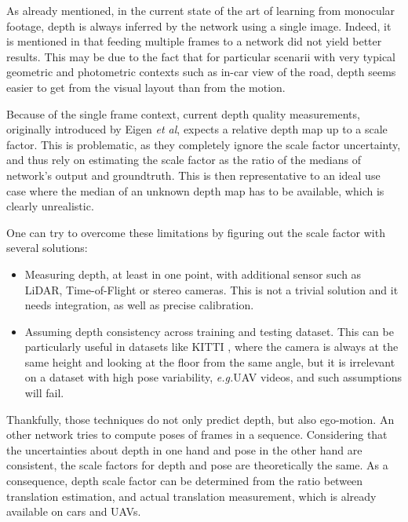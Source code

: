 \documentclass[runningheads]{llncs}
\def\eg{\emph{e.g.}\:}
\def\etal{\emph{et al}\:}
\begin{document}
\label{section:critic}
As already mentioned, in the current state of the art 
of
learning from monocular footage, depth is always inferred by the network using a single image. Indeed, it is mentioned in \cite{zhou2017unsupervised} that feeding multiple frames to a network did not yield better results. This may be due to the fact that for particular scenarii with very 
typical geometric and photometric contexts
such as in-car view of the road, depth seems easier to get from the 
visual layout
than from the motion.

Because of the single frame context, current depth quality measurements, originally introduced by Eigen \etal \cite{eigen2014depth}, expects a relative depth map up to a scale factor. This is problematic, as they completely ignore the scale factor uncertainty, and thus rely on 
estimating the scale factor as
the ratio of the medians of network's output and groundtruth. This is then representative to an ideal use case where the median of an unknown depth map has to be available, which is clearly unrealistic.

One can try to overcome these limitations by figuring out the scale factor with several solutions:
\begin{itemize}
\item Measuring depth, at least in one point, with additional sensor such as LiDAR, 
Time-of-Flight
or stereo cameras. This is not a trivial solution and it needs integration, as 
well
as precise calibration.

\item Assuming depth consistency across training and testing dataset. This can be particularly useful in datasets like KITTI \cite{geiger2013vision}, where the camera is always at the same height and looking at the floor 
from
the same angle, but it 
is irrelevant on a dataset with high pose variability, 
\eg UAV videos, and such assumptions will fail.
\end{itemize}

Thankfully, those techniques 
do
not only predict depth, but also ego-motion. An other network tries to compute poses of frames in a sequence. Considering that the 
uncertainties
about depth in one hand and pose in the other hand are consistent, the scale factors for depth and pose are theoretically the same. 
As a consequence, depth scale factor can be determined from the ratio between translation estimation, and actual translation measurement, which is already available on cars and UAVs.
\end{document}
